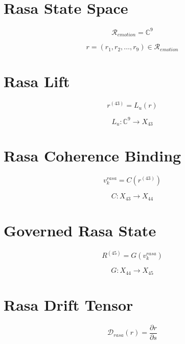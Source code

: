 
\section*{Rasa State Space}

\[
\mathcal{R}_{emotion} = \mathbb{C}^9
\]

\[
r = (r_1, r_2, \ldots, r_9) \in \mathcal{R}_{emotion}
\]


\section*{Rasa Lift}

\[
r^{(43)} = L_u(r)
\]

\[
L_u : \mathbb{C}^9 \to X_{43}
\]


\section*{Rasa Coherence Binding}

\[
v_k^{rasa} = C(r^{(43)})
\]

\[
C : X_{43} \to X_{44}
\]


\section*{Governed Rasa State}

\[
R^{(45)} = G(v_k^{rasa})
\]

\[
G : X_{44} \to X_{45}
\]


\section*{Rasa Drift Tensor}

\[
\mathcal{D}_{rasa}(r)
= \frac{\partial r}{\partial s}
\]


